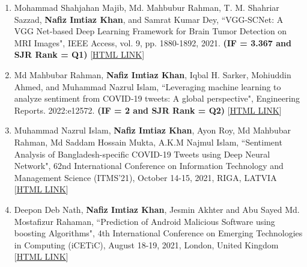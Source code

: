 \begin{enumerate}
    \item Mohammad Shahjahan Majib, Md. Mahbubur Rahman, T. M. Shahriar Sazzad, \textbf{Nafiz Imtiaz Khan}, and Samrat Kumar Dey, “VGG-SCNet: A VGG Net-based Deep Learning Framework for Brain Tumor Detection on MRI Images", IEEE Access, vol. 9, pp. 1880-1892, 2021. \textbf{(IF = 3.367 and SJR Rank = Q1)} [\href{https://ieeexplore.ieee.org/document/9515947}{\underline{HTML LINK}}]

    \item Md Mahbubar Rahman, \textbf{Nafiz Imtiaz Khan}, Iqbal H. Sarker, Mohiuddin Ahmed, and Muhammad Nazrul Islam, “Leveraging machine learning to analyze sentiment from COVID‐19 tweets: A global perspective", Engineering Reports. 2022:e12572. \textbf{(IF = 2 and SJR Rank = Q2)} [\href{https://onlinelibrary.wiley.com/doi/full/10.1002/eng2.12572}{\underline{HTML LINK}}]

    \item Muhammad Nazrul Islam, \textbf{Nafiz Imtiaz Khan}, Ayon Roy, Md Mahbubar Rahman, Md Saddam Hossain Mukta, A.K.M Najmul Islam, “Sentiment Analysis of Bangladesh-specific COVID-19 Tweets using Deep Neural Network", 62nd International Conference on Information Technology and Management Science (ITMS'21), October 14-15, 2021, RIGA, LATVIA [\href{https://ieeexplore.ieee.org/document/9615331}{\underline{HTML LINK}}]

    \item Deepon Deb Nath, \textbf{Nafiz Imtiaz Khan}, Jesmin Akhter and Abu Sayed Md. Mostafizur Rahaman, “Prediction of Android Malicious Software using boosting Algorithms", 4th International Conference on Emerging Technologies in Computing (iCETiC), August 18-19, 2021, London, United Kingdom [\href{https://LINK.springer.com/chapter/10.1007/978-3-030-90016-8_2?fbclid=IwAR1zpwvBxfsSL0-GbbWVtu9SCRuARConZ39zQYq55ffOD7-zILDDci00u-w}{\underline{HTML LINK}}]








    
    

    
\end{enumerate}




